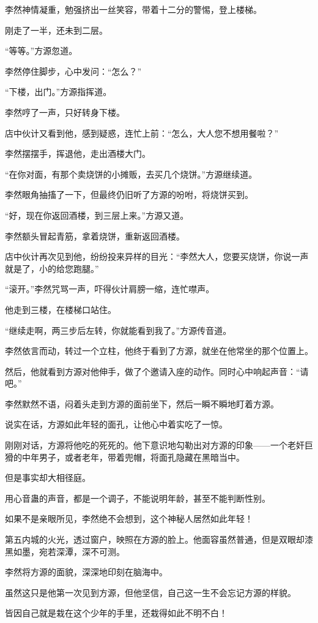 \begin{this_body}
李然神情凝重，勉强挤出一丝笑容，带着十二分的警惕，登上楼梯。

刚走了一半，还未到二层。

“等等。”方源忽道。

李然停住脚步，心中发问：“怎么？”

“下楼，出门。”方源指挥道。

李然哼了一声，只好转身下楼。

店中伙计又看到他，感到疑惑，连忙上前：“怎么，大人您不想用餐啦？”

李然摆摆手，挥退他，走出酒楼大门。

“在你对面，有那个卖烧饼的小摊贩，去买几个烧饼。”方源继续道。

李然眼角抽搐了一下，但最终仍旧听了方源的吩咐，将烧饼买到。

“好，现在你返回酒楼，到三层上来。”方源又道。

李然额头冒起青筋，拿着烧饼，重新返回酒楼。

店中伙计再次见到他，纷纷投来异样的目光：“李然大人，您要买烧饼，你说一声就是了，小的给您跑腿。”

“滚开。”李然咒骂一声，吓得伙计肩膀一缩，连忙噤声。

他走到三楼，在楼梯口站住。

“继续走啊，两三步后左转，你就能看到我了。”方源传音道。

李然依言而动，转过一个立柱，他终于看到了方源，就坐在他常坐的那个位置上。

然后，他就看到方源对他伸手，做了个邀请入座的动作。同时心中响起声音：“请吧。”

李然默然不语，闷着头走到方源的面前坐下，然后一瞬不瞬地盯着方源。

说实在话，方源如此年轻的面孔，让他心中着实吃了一惊。

刚刚对话，方源将他吃的死死的。他下意识地勾勒出对方源的印象——一个老奸巨猾的中年男子，或者老年，带着兜帽，将面孔隐藏在黑暗当中。

但是事实却大相径庭。

用心音蛊的声音，都是一个调子，不能说明年龄，甚至不能判断性别。

如果不是亲眼所见，李然绝不会想到，这个神秘人居然如此年轻！

第五内城的火光，透过窗户，映照在方源的脸上。他面容虽然普通，但是双眼却漆黑如墨，宛若深潭，深不可测。

李然将方源的面貌，深深地印刻在脑海中。

虽然这只是他第一次见到方源，但他坚信，自己这一生不会忘记方源的样貌。

皆因自己就是栽在这个少年的手里，还栽得如此不明不白！

\end{this_body}

